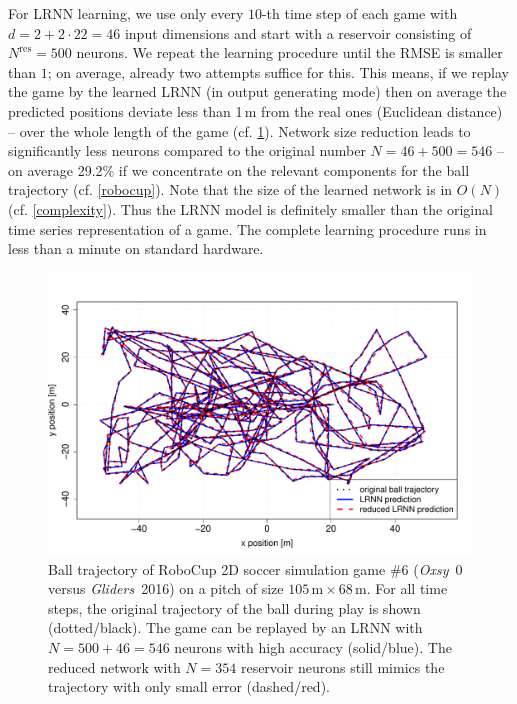 \documentclass[twoside,11pt]{article}
\theoremstyle{definition}
\begin{document}
For LRNN learning, we use only every $10$-th time step of each game with $d =
2+2 \cdot 22 = 46$ input dimensions and start with a reservoir consisting of
$N^\mathrm{res} = 500$ neurons. We repeat the learning procedure until the RMSE
is smaller than $1$; on average, already two attempts suffice for this. This
means, if we replay the game by the learned LRNN (in output generating mode)
then on average the predicted positions deviate less than 1\,m from the real
ones (Euclidean distance) -- over the whole length of the game (cf.
\cref{game}). Network size reduction leads to significantly less neurons
compared to the original number $N = 46+500 = 546$ -- on average 29.2\% if we
concentrate on the relevant components for the ball trajectory (cf.
\cref{robocup}). Note that the size of the learned network is in $O(N)$ (cf.
\cref{complexity}). Thus the LRNN model is definitely smaller than the
original time series representation of a game. The complete learning procedure
runs in less than a minute on standard hardware.

\begin{figure}[htb]
  \centering
  \includegraphics[width=0.8\columnwidth]{fig/game6.pdf}
  \caption{Ball trajectory of RoboCup 2D soccer simulation game \#6
	(\emph{Oxsy}~0 versus \emph{Gliders}~2016) on a pitch of size
	$105\,\mathrm{m} \times 68\,\mathrm{m}$. For all time steps, the
	original trajectory of the ball during play is shown (dotted/black). The
	game can be replayed by an LRNN with $N = 500+46 = 546$ neurons with high
	accuracy (solid/blue). The reduced network with $N = 354$ reservoir
	neurons still mimics the trajectory with only small error (dashed/red).
	\label{game}}
\end{figure}
\end{document}
